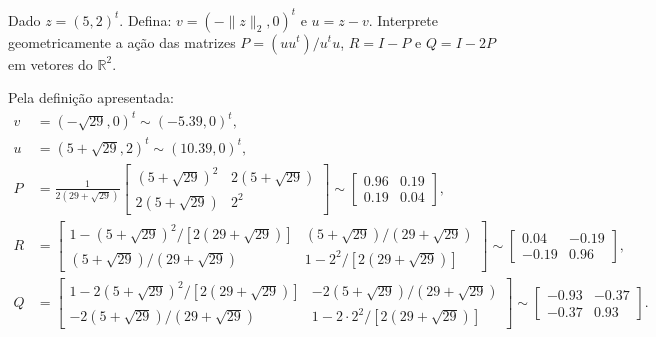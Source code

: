 \documentclass[a4paper,12pt, leqno, answers]{exam}
\begin{document}
\begin{questions}
    \question Dado $z = (5, 2)^t$. Defina: $v = \left( -\| z \|_2, 0 \right)^t$ e $u = z - v$. Interprete geometricamente a a\c{c}\~{a}o das matrizes $P = \left( u u^t \right) / u^t u$, $R = I - P$ e $Q = I - 2P$ em vetores do $\mathbb{R}^2$.
    \begin{solution}
        Pela defini\c{c}\~{a}o apresentada:
        \begin{align*}
            v &= \left( -\sqrt{29}, 0 \right)^t \sim \left( -5.39, 0 \right)^t, \\
            u &= \left( 5 + \sqrt{29}, 2 \right)^t \sim \left( 10.39, 0 \right)^t, \\
            P &= \frac{1}{2 \left( 29 + \sqrt{29} \right)} \begin{bmatrix}
                \left( 5 + \sqrt{29} \right)^2 & 2 \left( 5 + \sqrt{29} \right) \\
                2 \left( 5 + \sqrt{29} \right) & 2^2
            \end{bmatrix} \sim \begin{bmatrix}
                0.96 & 0.19 \\
                0.19 & 0.04
            \end{bmatrix}, \\
            R &= \begin{bmatrix}
                1 - \left( 5 + \sqrt{29} \right)^2 / \left[ 2 \left( 29 + \sqrt{29} \right) \right] & \left( 5 + \sqrt{29} \right) / \left( 29 + \sqrt{29} \right) \\
                \left( 5 + \sqrt{29} \right) / \left( 29 + \sqrt{29} \right) & 1 - 2^2 / \left[ 2 \left( 29 + \sqrt{29} \right) \right]
            \end{bmatrix} \sim \begin{bmatrix}
                0.04 & -0.19 \\
                -0.19 & 0.96
            \end{bmatrix}, \\
            Q &= \begin{bmatrix}
                1 - 2 \left( 5 + \sqrt{29} \right)^2 / \left[ 2 \left( 29 + \sqrt{29} \right) \right] & - 2 \left( 5 + \sqrt{29} \right) / \left( 29 + \sqrt{29} \right) \\
                - 2 \left( 5 + \sqrt{29} \right) / \left( 29 + \sqrt{29} \right) & 1 - 2 \cdot 2^2 / \left[ 2 \left( 29 + \sqrt{29} \right) \right]
            \end{bmatrix} \sim \begin{bmatrix}
                -0.93 & -0.37 \\
                -0.37 & 0.93
            \end{bmatrix}.
        \end{align*}


\end{solution}
\end{questions}
\end{document}
